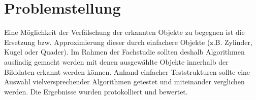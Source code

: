 
\chapter{Problemstellung}
Eine Möglichkeit der Verfälschung der erkannten Objekte zu begegnen ist die Ersetzung bzw. Approximierung dieser durch einfachere Objekte (z.B. Zylinder, Kugel oder Quader). Im Rahmen der Fachstudie sollten deshalb Algorithmen ausfindig gemacht werden mit denen ausgewählte Objekte innerhalb der Bilddaten erkannt werden können. Anhand einfacher Teststrukturen sollte eine Auswahl vielversprechender Algorithmen getestet und miteinander verglichen werden. Die Ergebnisse wurden protokolliert und bewertet.
